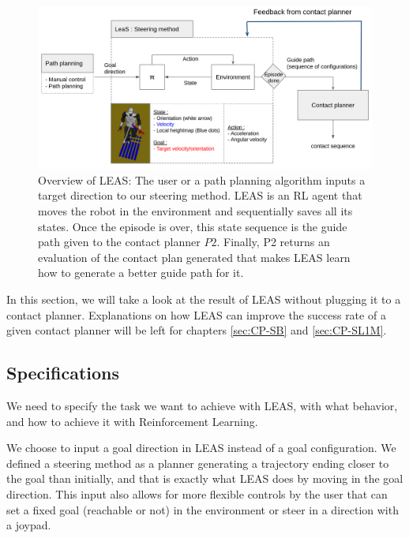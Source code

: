 \begin{figure}
    \centering
    \includegraphics[width=\textwidth]{Figures/Chapter_LEAS/leas_overview.png}
    \caption{Overview of LEAS: The user or a path planning algorithm inputs a target direction to our steering method. LEAS is an RL agent that moves the robot in the environment and sequentially saves all its states. Once the episode is over, this state sequence is the guide path given to the contact planner $P2$. Finally, P2 returns an evaluation of the contact plan generated that makes LEAS learn how to generate a better guide path for it.}
    \label{fig:LEAS}
\end{figure}

In this section, we will take a look at the result of LEAS without plugging it to a contact planner.
Explanations on how LEAS can improve the success rate of a given contact planner will be left for chapters \ref{sec:CP-SB} and \ref{sec:CP-SL1M}.

\subsection{Specifications \label{subsubsec:specifications}}
We need to specify the task we want to achieve with LEAS, with what behavior, and how to achieve it with Reinforcement Learning.

We choose to input a goal direction in LEAS instead of a goal configuration.
We defined a steering method as a planner generating a trajectory ending closer to the goal than initially, and that is exactly what LEAS does by moving in the goal direction.
This input also allows for more flexible controls by the user that can set a fixed goal (reachable or not) in the environment or steer in a direction with a joypad.

